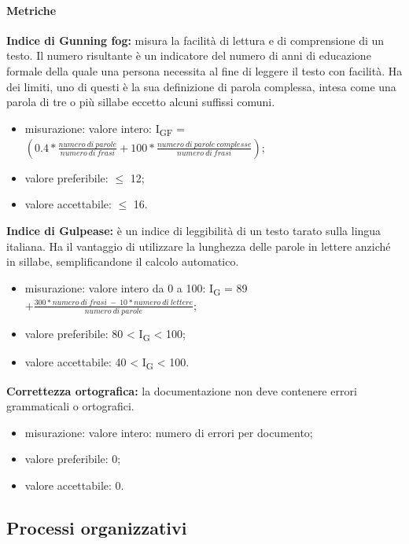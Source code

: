 \paragraph{Metriche}
\textbf{Indice di Gunning fog:} misura la facilità di lettura e di comprensione di un testo. Il numero risultante è un indicatore del numero di anni 
di educazione formale della quale una persona necessita al fine di leggere il testo con facilità.
Ha dei limiti, uno di questi è la sua definizione di parola complessa, intesa come una parola di
tre o più sillabe eccetto alcuni suffissi comuni.
\begin{itemize}
    \item misurazione: valore intero: I\textsubscript{GF} = $(0.4 *\frac{numero \ di \ parole}{numero \ di \ frasi} + 100 * \frac{numero \ di \ parole \ complesse}{numero \ di \ frasi})$;
    \item valore preferibile: $\leq$ 12;
    \item valore accettabile: $\leq$ 16.
\end{itemize}
\textbf{Indice di Gulpease:} è un indice di leggibilità di un testo tarato sulla lingua italiana. 
Ha il vantaggio di utilizzare la lunghezza delle parole in lettere anziché in sillabe, semplificandone il calcolo automatico. 
\begin{itemize}
    \item misurazione: valore intero da 0 a 100: I\textsubscript{G} = 89 $+ \frac{300*numero \ di \ frasi \ - \ 10*numero \ di \ lettere}{numero \ di \ parole}$;
    \item valore preferibile: 80 < I\textsubscript{G} < 100;
    \item valore accettabile: 40 < I\textsubscript{G} < 100.
\end{itemize}
\textbf{Correttezza ortografica:} la documentazione non deve contenere errori grammaticali o ortografici. 
\begin{itemize}
    \item misurazione: valore intero: numero di errori per documento;
    \item valore preferibile: 0;
    \item valore accettabile: 0.
\end{itemize}
\subsection{Processi organizzativi}
